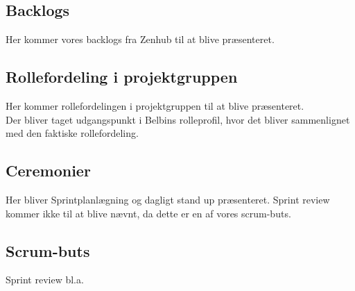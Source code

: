 \subsection{Backlogs}
Her kommer vores backlogs fra Zenhub til at blive præsenteret.

\subsection{Rollefordeling i projektgruppen}
Her kommer rollefordelingen i projektgruppen til at blive præsenteret.\\

\noindent
Der bliver taget udgangspunkt i Belbins rolleprofil, hvor det bliver sammenlignet med den faktiske rollefordeling.

\subsection{Ceremonier}
Her bliver Sprintplanlægning og dagligt stand up præsenteret. Sprint review kommer ikke til at blive nævnt, da dette er en af vores scrum-buts.

\subsection{Scrum-buts}
Sprint review bl.a.